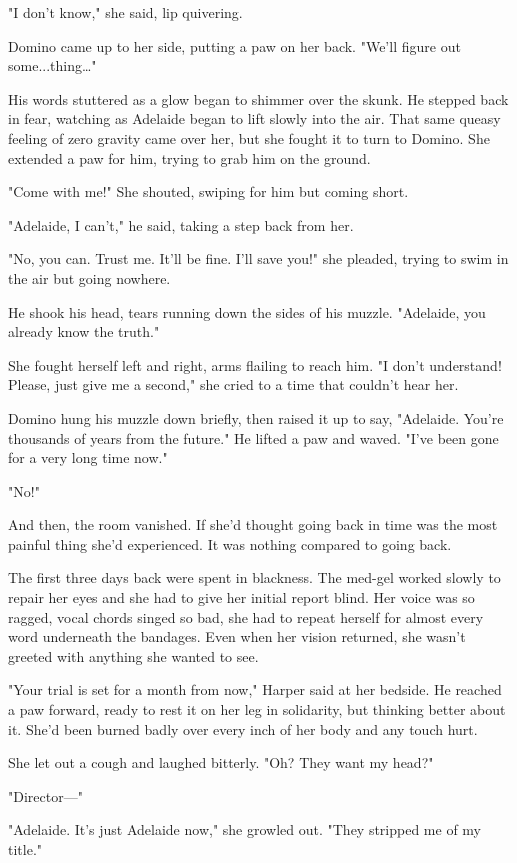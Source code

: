 "I don't know," she said, lip quivering.

Domino came up to her side, putting a paw on her back. "We'll figure out some...thing\ldots"

His words stuttered as a glow began to shimmer over the skunk. He stepped back in fear, watching as Adelaide began to lift slowly into the air. That same queasy feeling of zero gravity came over her, but she fought it to turn to Domino. She extended a paw for him, trying to grab him on the ground.

"Come with me!" She shouted, swiping for him but coming short.

"Adelaide, I can't," he said, taking a step back from her.

"No, you can. Trust me. It'll be fine. I'll save you!" she pleaded, trying to swim in the air but going nowhere.

He shook his head, tears running down the sides of his muzzle. "Adelaide, you already know the truth."

She fought herself left and right, arms flailing to reach him. "I don't understand! Please, just give me a second," she cried to a time that couldn't hear her.

Domino hung his muzzle down briefly, then raised it up to say, "Adelaide. You're thousands of years from the future." He lifted a paw and waved. "I've been gone for a very long time now."

"No!"

And then, the room vanished. If she'd thought going back in time was the most painful thing she'd experienced. It was nothing compared to going back.

The first three days back were spent in blackness. The med-gel worked slowly to repair her eyes and she had to give her initial report blind. Her voice was so ragged, vocal chords singed so bad, she had to repeat herself for almost every word underneath the bandages. Even when her vision returned, she wasn't greeted with anything she wanted to see.

"Your trial is set for a month from now," Harper said at her bedside. He reached a paw forward, ready to rest it on her leg in solidarity, but thinking better about it. She'd been burned badly over every inch of her body and any touch hurt.

She let out a cough and laughed bitterly. "Oh? They want my head?"

"Director---"

"Adelaide. It's just Adelaide now," she growled out. "They stripped me of my title."

